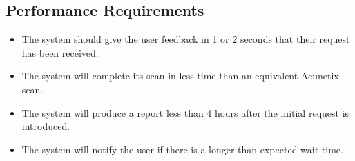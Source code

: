 \subsection{Performance Requirements}
\begin{itemize}
    \item The system should give the user feedback in 1 or 2 seconds that their request has been received.
    \item The system will complete its scan in less time than an equivalent Acunetix scan.
    \item {}The system will produce a report less than 4 hours after the initial request is introduced. 
    \item The system will notify the user if there is a longer than expected wait time.
\end{itemize}
